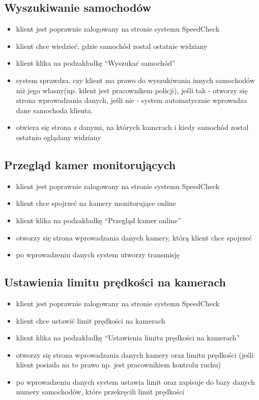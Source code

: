 \documentclass[12pt]{article}
\begin{document}
	\subsection{Wyszukiwanie samochodów}
	\begin{itemize}
	\item klient jest poprawnie zalogowany na stronie systemu SpeedCheck
	\item klient chce wiedzieć, gdzie samochód zostal ostatnie widziany  
	\item klient klika na podzakładkę “Wyszukać samochód”
	\item system sprawdza, czy klient ma prawo do wyszukiwania innych samochodów niż jego własny(np. kilent jest pracownikem policji), jeśli tak - otworzy się strona wprowadzania danych, jeśli nie - system automatycznie wprowadza dane samochoda klienta.
	\item otwiera się strona z danymi, na których kamerach i kiedy samochód zostal ostatnio oglądany 			widziany
	\end{itemize}
	
	\subsection{Przegląd kamer monitorujących}
	\begin{itemize}
	\item klient jest poprawnie zalogowany na stronie systemu SpeedCheck
	\item klient chce spojrzeć na kamery monitorujące online
	\item klient klika na podzakładkę “Przegląd kamer online”
	\item otworzy się strona wprowadzania danych kamery, którą klient chce spojrzeć
	\item po wprowadzeniu danych system utworzy transmisję
	\end{itemize}
	
	\subsection{Ustawienia limitu prędkości na kamerach}
	\begin{itemize}
	\item klient jest poprawnie zalogowany na stronie systemu SpeedCheck
	\item klient chce ustawić limit prędkości na kamerach
	\item klient klika na podzakładkę “Ustawienia limitu prędkości na kamerach”
	\item otworzy się strona wprowadzania danych kamery oraz limitu prędkości (jeśli klient posiada na to prawo np. jest pracownikiem kontrolu ruchu)
	\item po wprowadzeniu danych system ustawia limit oraz zapisuje do bazy danych numery samochodów, które
	przekręcili limit prędkości	
	\end{itemize}
	
\end{document}
